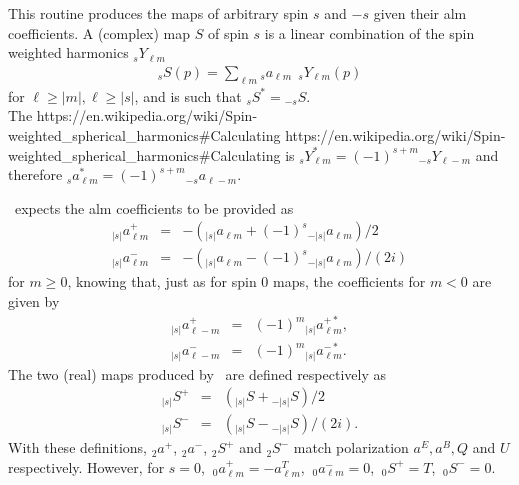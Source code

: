 \sloppy
{}\section[alm2map\_spin*]{ }
\label{sub:alm2map_spin}
\author{Eric Hivon}

\begin{facility}
{This routine produces the maps of arbitrary spin $s$ and $-s$ given their alm
coefficients.
%
A (complex) map $S$ of spin $s$ is a linear combination of the spin weighted harmonics ${_s}Y_{\ell m}$
\begin{eqnarray}
	\label{eq:alm2map_spin_a}
	{_s}S(p) = \sum_{\ell m} {_s}a_{\ell m}\ \ {_s}Y_{\ell m}(p)
\end{eqnarray}
for $\ell \ge |m|, \ell \ge |s|$,
and is such that ${_s}S^* = {_{-s}}S$.\\
The 
%
{https://en.wikipedia.org/wiki/Spin-weighted_spherical_harmonics\#Calculating}%
{https://en.wikipedia.org/wiki/Spin-weighted_spherical_harmonics\#Calculating}
is
${_s}Y_{\ell m}^* = (-1)^{s+m} {_{-s}}Y_{\ell -m}$
and therefore 
${_s}a_{\ell m}^* = (-1)^{s+m} {_{-s}}a_{\ell -m}$.


%
\thedocid\ expects the alm coefficients to be provided as
\begin{eqnarray}
	\label{eq:alm2map_spin_b}
	{_{|s|}}a^{+}_{\ell m} &=& - ( {_{|s|}}a_{\ell m} + (-1)^s {_{-|s|}}a_{\ell m} )/2 \nonumber \\
	{_{|s|}}a^{-}_{\ell m} &=& - ( {_{|s|}}a_{\ell m} - (-1)^s {_{-|s|}}a_{\ell m} )/(2i)\nonumber
\end{eqnarray}
for $m\ge 0$, knowing that, just as for spin 0 maps, the
coefficients for $m<0$ are given by 
\begin{eqnarray}
	\label{eq:alm2map_spin_c}
	{_{|s|}}a^{+}_{\ell-m} &=& (-1)^m {_{|s|}}a^{+*}_{\ell m}, \nonumber\\
	{_{|s|}}a^{-}_{\ell-m} &=& (-1)^m {_{|s|}}a^{-*}_{\ell m}. \nonumber
\end{eqnarray}
%
The two (real) maps produced by \thedocid\ are defined respectively as
\begin{eqnarray}
	\label{eq:alm2map_spin_d}
	{_{|s|}}S^+ &=& ({_{|s|}}S + {_{-|s|}}S)/2    \nonumber\\
	{_{|s|}}S^- &=& ({_{|s|}}S - {_{-|s|}}S)/(2i).\nonumber
\end{eqnarray}
%
With these definitions, ${_2}a^{+}$, ${_2}a^{-}$, ${_2}S^+$ and ${_2}S^-$
match \healpix polarization $a^E, a^B, Q$ and $U$ respectively. However, for
$s=0$, $\ _{0}a^+_{\ell m} = -a^T_{\ell m}$, $\ _{0}a^-_{\ell m} = 0$, $\ {_0}S^+ = T$, $\ {_0}S^- = 0.$}
{\modAlmTools}
\end{facility}

